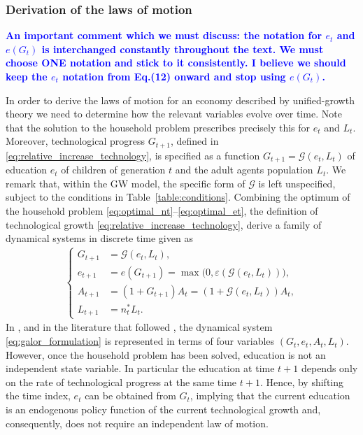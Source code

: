 \documentclass[a4paper,fleqn]{cas-sc}
\newcommand{\samb}[1]{\textcolor{blue}{\textbf{#1}}}
\begin{document}
\subsubsection{Derivation of the laws of motion}\label{subsubsec:law_of_motion} 
\samb{An important comment which we must discuss: the notation for $e_t$ and $e(G_t)$ is interchanged constantly throughout the text. We must choose ONE notation and stick to it consistently. I believe we should keep the $e_t$ notation from Eq.(12) onward and stop using $e(G_t)$.}

In order to derive the laws of motion for an economy described by unified-growth theory we need to determine how the relevant variables evolve over time. Note that the solution to the household problem prescribes precisely this for $e_t$ and $L_t$. Moreover, technological progress $G_{t+1}$, defined in \eqref{eq:relative_increase_technology}, is specified as a function $G_{t+1} = \mathcal G(e_t,L_t)$ of education $e_t$ of children of generation $t$ and the adult agents population $L_t$.
We remark that, within the GW model, the specific form of $\mathcal G$ is left unspecified, subject to the conditions in Table~\ref{table:conditions}. 
Combining the optimum of the household problem \eqref{eq:optimal_nt}--\eqref{eq:optimal_et}, the definition of technological growth \eqref{eq:relative_increase_technology}, \citet{Galor2000} derive a family of dynamical systems in discrete time given as 
%
\begin{align}\label{eq:galor_formulation} 
    \begin{cases} 
        G_{t+1} &= \mathcal G(e_t,L_t),\\
        e_{t+1} &= e(G_{t+1}) = \max\!\big(0,\varepsilon(\mathcal G(e_t,L_t))\big), \\
        A_{t+1} &= (1+G_{t+1})A_t = (1+\mathcal G(e_t,L_t))A_t, \\
        L_{t+1} &= n_t^*L_t. 
    \end{cases} 
\end{align} 
%
In \citet{Galor2000}, and in the literature that followed \citep{Galor2005,Galor2011,Lagerlof2006}, the dynamical system \eqref{eq:galor_formulation} is represented in terms of four variables $(G_t,e_t,A_t,L_t)$. 
However, once the household problem has been solved, education is not an independent state variable.
In particular the education at time $t+1$ depends only on the rate of technological progress at the same time $t+1$.
Hence, by shifting the time index, $e_t$ can be obtained from $G_t$, implying that the current education is an endogenous policy function of the current technological growth and, consequently, does not require an independent law of motion.
\end{document}
